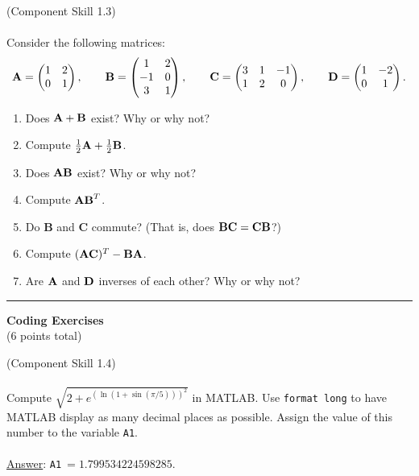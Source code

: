 \documentclass[12pt]{article}
\newenvironment{exercise}[2][\large Exercise]{\begin{trivlist}
\item[\centering \Large \hskip \labelsep {\bfseries #1}\hskip \labelsep {\bfseries #2.}]}{\end{trivlist}}
\begin{document}
\begin{exercise}{\large 3} {\large (Component Skill 1.3)} ~\\\\
Consider the following matrices:
\begin{align*}
\textrm{\bf A} = \begin{pmatrix} 1 & 2 \\ 0 & 1 \end{pmatrix}, \quad \quad \textrm{\bf B} = \begin{pmatrix} 1 & 2 \\ -1 & 0 \\ 3 & 1 \end{pmatrix}, \quad \quad \textrm{\bf C} = \begin{pmatrix} 3 & 1 & -1 \\ 1 & 2 & 0 \end{pmatrix}, \quad \quad \textrm{\bf D} = \begin{pmatrix} 1 & -2 \\ 0 & 1 \end{pmatrix}.
\end{align*}
\begin{enumerate}
\item Does $\textrm{\bf A} + \textrm{\bf B}$ exist? Why or why not?
\item Compute $\frac12 \textrm{\bf A} + \frac12 \textrm{\bf B}$. 
\item Does $\textrm{\bf AB}$ exist? Why or why not?
\item Compute $\textrm{\bf AB}^T$.
\item Do \textrm{\bf B} and \textrm{\bf C} commute? (That is, does $\textrm{\bf BC} = \textrm{\bf CB}$?)
\item Compute $(\textrm{\bf AC})^T - \textrm{\bf BA}$.
\item Are $\textrm{\bf A}$ and $\textrm{\bf D}$ inverses of each other? Why or why not?
\end{enumerate}
\end{exercise} 
\clearpage
\hrule
\begin{center}\Large \textbf{Coding Exercises} \\ \normalsize (6 points total) \normalsize \end{center}
\vspace*{0.2cm}
\begin{exercise}{\large 1} {\large (Component Skill 1.4)} ~\\\\
Compute $\sqrt{2 + e^{(\ln(1+\sin(\pi/5)))^2}}$ in MATLAB. Use \verb|format long| to have MATLAB display as many decimal places as possible. Assign the value of this number to the variable \verb|A1|. \\\\
\underline{Answer}: \verb|A1|$~= 1.799534224598285$.
\end{exercise}
\end{document}
